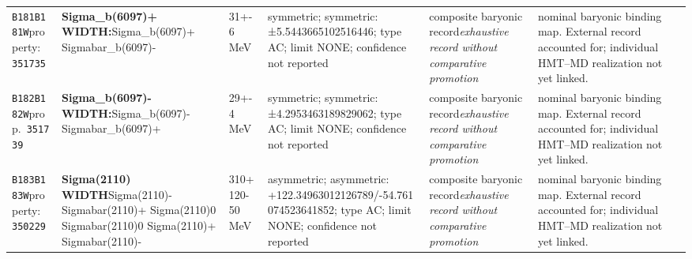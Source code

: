 \begin{landscape}
\begin{longtable}{L{1.85cm}L{4.45cm}L{2.35cm}L{4.05cm}L{3.35cm}L{7.15cm}}
\texttt{B181}\newline \texttt{B181W}\newline property:\ \texttt{351735} & \textbf{Sigma\_\allowbreak{}b(6097)+ WIDTH:}\newline Sigma\_\allowbreak{}b(6097)+ \textbar{}\allowbreak{} Sigmabar\_\allowbreak{}b(6097)- & 31+-6\,MeV & symmetric; symmetric: ±5.5443665102516446; type AC; limit NONE; confidence not reported & composite baryonic record\newline \emph{exhaustive record without comparative promotion} & nominal baryonic binding map. External record accounted for; individual HMT--MD realization not yet linked. \\
\texttt{B182}\newline \texttt{B182W}\newline prop.\ \texttt{351739} & \textbf{Sigma\_\allowbreak{}b(6097)- WIDTH:}\newline Sigma\_\allowbreak{}b(6097)- \textbar{}\allowbreak{} Sigmabar\_\allowbreak{}b(6097)+ & 29+-4\,MeV & symmetric; symmetric: ±4.2953463189829062; type AC; limit NONE; confidence not reported & composite baryonic record\newline \emph{exhaustive record without comparative promotion} & nominal baryonic binding map. External record accounted for; individual HMT--MD realization not yet linked. \\
\texttt{B183}\newline \texttt{B183W}\newline property:\ \texttt{350229} & \textbf{Sigma(2110) WIDTH}\newline Sigma(2110)- \textbar{}\allowbreak{} Sigmabar(2110)+ \textbar{}\allowbreak{} Sigma(2110)0 \textbar{}\allowbreak{} Sigmabar(2110)0 \textbar{}\allowbreak{} Sigma(2110)+ \textbar{}\allowbreak{} Sigmabar(2110)- & 310+120-50\,MeV & asymmetric; asymmetric: +122.34963012126789/-54.761074523641852; type AC; limit NONE; confidence not reported & composite baryonic record\newline \emph{exhaustive record without comparative promotion} & nominal baryonic binding map. External record accounted for; individual HMT--MD realization not yet linked. \\

\end{longtable}
\end{landscape}
